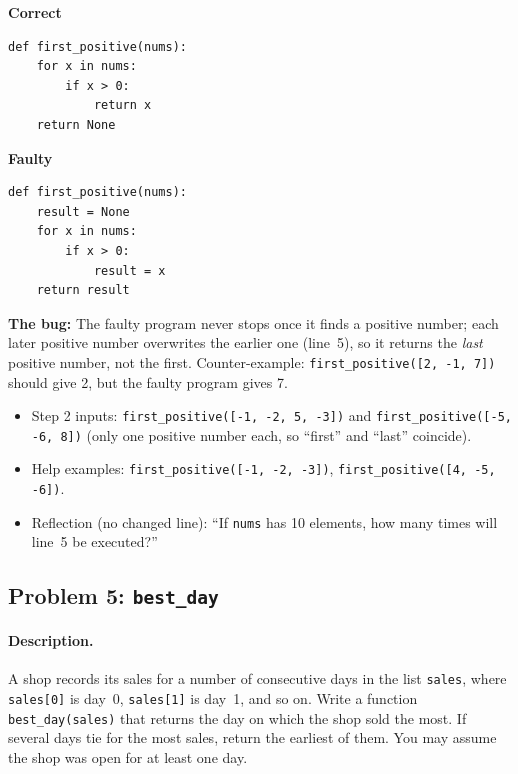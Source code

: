 \documentclass[11pt,a4paper]{article}
\newenvironment{codepair}{\par\noindent}{\par\medskip}
\newcommand{\codelabel}[1]{\textbf{\small #1}\par\vspace{2pt}}
\newcommand{\bugnote}[1]{\par\noindent\textcolor{bugred}{\textbf{The bug:}} #1\par\smallskip}
\begin{document}
\begin{codepair}
\begin{minipage}[t]{0.48\textwidth}
\codelabel{Correct}
\begin{lstlisting}
def first_positive(nums):
    for x in nums:
        if x > 0:
            return x
    return None
\end{lstlisting}
\end{minipage}\hfill
\begin{minipage}[t]{0.48\textwidth}
\codelabel{Faulty}
\begin{lstlisting}
def first_positive(nums):
    result = None
    for x in nums:
        if x > 0:
            result = x
    return result
\end{lstlisting}
\end{minipage}
\end{codepair}

\bugnote{The faulty program never stops once it finds a positive number;
each later positive number overwrites the earlier one (line~5), so it
returns the \emph{last} positive number, not the first.
Counter-example: \texttt{first\_positive([2, -1, 7])} should give 2, but
the faulty program gives 7.}

\begin{itemize}[nosep]
  \item Step 2 inputs: \texttt{first\_positive([-1, -2, 5, -3])} and
        \texttt{first\_positive([-5, -6, 8])} (only one positive number
        each, so ``first'' and ``last'' coincide).
  \item Help examples: \texttt{first\_positive([-1, -2, -3])},
        \texttt{first\_positive([4, -5, -6])}.
  \item Reflection (no changed line): ``If \texttt{nums} has 10 elements,
        how many times will line~5 be executed?''
\end{itemize}

\subsection{Problem 5: \texttt{best\_day}}

\paragraph{Description.} A shop records its sales for a number of
consecutive days in the list \texttt{sales}, where \texttt{sales[0]} is
day~0, \texttt{sales[1]} is day~1, and so on. Write a function
\texttt{best\_day(sales)} that returns the day on which the shop sold the
most. If several days tie for the most sales, return the earliest of
them. You may assume the shop was open for at least one day.
\end{document}
